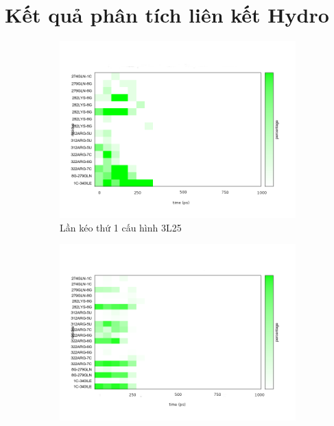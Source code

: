 \documentclass[12pt,a4paper,reqno, oneside]{book}
\begin{document}
\section{Kết quả phân tích liên kết Hydro}
\begin{figure}[h!]
\centering
\begin{subfigure}{0.7\textwidth}
\vspace{-20pt}
\includegraphics[width=\textwidth,natwidth=610,natheight=642]{hbond3L25_pull1}
\vspace{-40pt}
\caption{Lần kéo thứ 1 cấu hình 3L25}
\label{fig:hbond3L25_pull1}
\end{subfigure}
\begin{subfigure}{0.7\textwidth}
\vspace{-20pt}
\includegraphics[width=\textwidth,natwidth=610,natheight=642]{hbond3L25_pull2}

\end{subfigure}
\end{figure}
\end{document}
